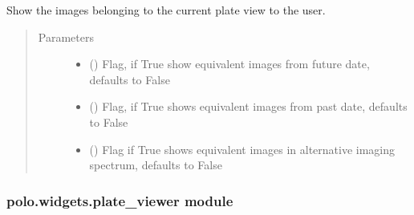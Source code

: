 \documentclass[letterpaper,10pt,english]{sphinxmanual}
\begin{document}
\begin{fulllineitems}
\begin{fulllineitems}
\label{\detokenize{polo.widgets:polo.widgets.plate_inspector_widget.PlateInspectorWidget.show_current_plate}}
Show the images belonging to the current plate view to the user.
\begin{quote}\begin{description}
\item[{Parameters}] \leavevmode\begin{itemize}
\item {} 
 (\sphinxstyleliteralemphasis{\sphinxupquote{, }}) \textendash{} Flag, if True show equivalent images from future 
date, defaults to False

\item {} 
 (\sphinxstyleliteralemphasis{\sphinxupquote{, }}) \textendash{} Flag, if True shows equivalent images from past
date, defaults to False

\item {} 
 (\sphinxstyleliteralemphasis{\sphinxupquote{, }}) \textendash{} Flag if True shows equivalent images in alternative
imaging spectrum, defaults to False

\end{itemize}

\end{description}\end{quote}

\end{fulllineitems}


\end{fulllineitems}



\subsubsection{polo.widgets.plate\_viewer module}
\label{\detokenize{polo.widgets:module-polo.widgets.plate_viewer}}\label{\detokenize{polo.widgets:polo-widgets-plate-viewer-module}}
\end{document}
